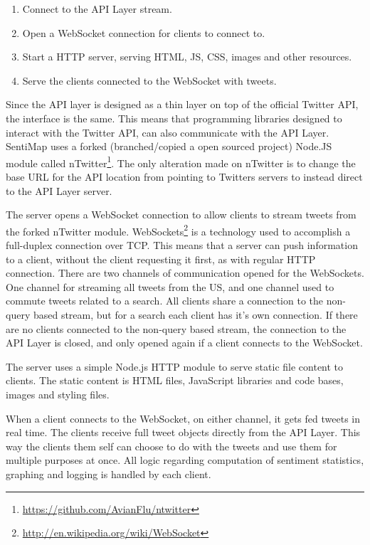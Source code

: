 \begin{enumerate}
\item Connect to the API Layer stream.
\item Open a WebSocket connection for clients to connect to. 
\item Start a HTTP server, serving HTML, JS, CSS, images and other resources. 
\item Serve the clients connected to the WebSocket with tweets.
\end{enumerate}

Since the API layer is designed as a thin layer on top of the official Twitter API, the interface is the same. This means that programming libraries designed to interact with the Twitter API, can also communicate with the API Layer. SentiMap uses a forked (branched/copied a open sourced project) Node.JS module called nTwitter\footnote{\url{https://github.com/AvianFlu/ntwitter}}. The only alteration made on nTwitter is to change the base URL for the API location from pointing to Twitters servers to instead direct to the API Layer server.

The server opens a WebSocket connection to allow clients to stream tweets from the forked nTwitter module. WebSockets\footnote{\url{http://en.wikipedia.org/wiki/WebSocket}} is a technology used to accomplish a full-duplex connection over TCP. This means that a server can push information to a client, without the client requesting it first, as with regular HTTP connection. There are two channels of communication opened for the WebSockets. One channel for streaming all tweets from the US, and one channel used to commute tweets related to a search. All clients share a connection to the non-query based stream, but for a search each client has it's own connection. If there are no clients connected to the non-query based stream, the connection to the API Layer is closed, and only opened again if a client connects to the WebSocket.

The server uses a simple Node.js HTTP module to serve static file content to clients. The static content is HTML files, JavaScript libraries and code bases, images and styling files.

When a client connects to the WebSocket, on either channel, it gets fed tweets in real time. The clients receive full tweet objects directly from the API Layer. This way the clients them self can choose to do with the tweets and use them for multiple purposes at once. All logic regarding computation of sentiment statistics, graphing and logging is handled by each client.

